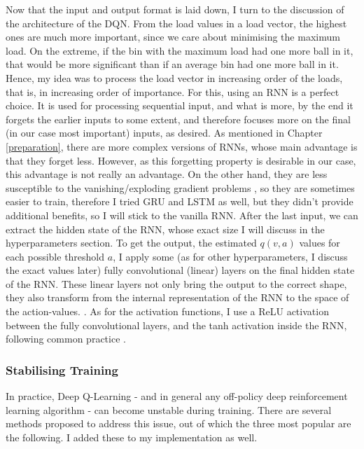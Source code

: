 Now that the input and output format is laid down, I turn to the discussion of the architecture of the DQN. From the load values in a load vector, the highest ones are much more important, since we care about minimising the maximum load. On the extreme, if the bin with the maximum load had one more ball in it, that would be more significant than if an average bin had one more ball in it. Hence, my idea was to process the load vector in increasing order of the loads, that is, in increasing order of importance. For this, using an RNN is a perfect choice. It is used for processing sequential input, and what is more, by the end it forgets the earlier inputs to some extent, and therefore focuses more on the final (in our case most important) inputs, as desired. As mentioned in Chapter \ref{preparation}, there are more complex versions of RNNs, whose main advantage is that they forget less. However, as this forgetting property is desirable in our case, this advantage is not really an advantage. On the other hand, they are less susceptible to the vanishing/exploding gradient problems \cite{noh2021rnnvanishinggradient}, so they are sometimes easier to train, therefore I tried GRU and LSTM as well, but they didn't provide additional benefits, so I will stick to the vanilla RNN. After the last input, we can extract the hidden state of the RNN, whose exact size I will discuss in the hyperparameters section. To get the output, the estimated $q(v,a)$ values for each possible threshold $a$, I apply some (as for other hyperparameters, I discuss the exact values later) fully convolutional (linear) layers on the final hidden state of the RNN. These linear layers not only bring the output to the correct shape, they also transform from the internal representation of the RNN to the space of the action-values. . As for the activation functions, I use a ReLU activation between the fully convolutional layers, and the tanh activation inside the RNN, following common practice \cite{szandala2020activationfunctions}.


\subsubsection{Stabilising Training}


In practice, Deep Q-Learning - and in general any off-policy deep reinforcement learning algorithm - can become unstable during training. There are several methods proposed to address this issue, out of which the three most popular are the following. I added these to my implementation as well.


